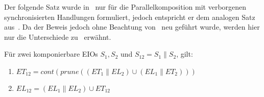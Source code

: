 Der folgende Satz wurde in~\cite{Vogler2014EIO} nur für die Parallelkomposition
mit verborgenen synchronisierten Handlungen formuliert, jedoch entspricht er dem
analogen Satz aus~\cite{Schlosser2012BA}. Da der Beweis jedoch ohne Beachtung
von~\cite{Schlosser2012BA} neu geführt wurde, werden hier nur die Unterschiede
zu~\cite{Vogler2014EIO} erwähnt.

\begin{satz}
  \label{satzErrorSemanik}
  Für zwei komponierbare EIOs $S_1, S_2$ und $S_{12}=S_1\|S_2$, gilt:
  \begin{enumerate}
    \item $ET_{12}=cont(prune((ET_1\|EL_2)\cup(EL_1\|ET_2)))$
    \item $EL_{12}=(EL_1\|EL_2)\cup ET_{12}$
  \end{enumerate}
\end{satz}

